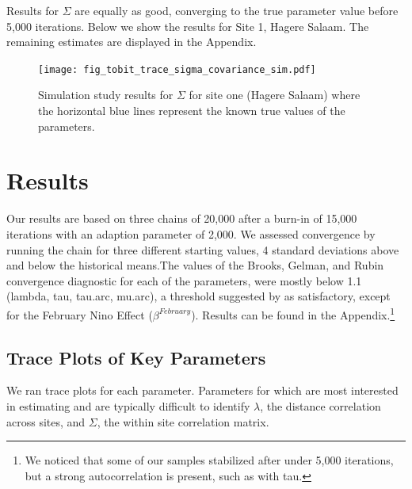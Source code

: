 \documentclass[12pt]{article}
\begin{document}
Results for $\Sigma$ are equally as good, converging to the true parameter value before 5,000 iterations. Below we show the results for Site 1, Hagere Salaam. The remaining estimates are displayed in the Appendix. 

\begin{figure}[htbp]
\begin{center}
\caption{Simulation study results for $\Sigma$ for site one (Hagere Salaam) where the horizontal blue lines represent the known true values of the parameters.}  
\texttt{[image: fig\_tobit\_trace\_sigma\_covariance\_sim.pdf]}   
\end{center}
\end{figure}



\section{Results}
\label{sec:results}
Our results are based on three chains of 20,000 after a burn-in of 15,000 iterations with an adaption parameter of 2,000. We assessed convergence by running the chain for three different starting values, 4 standard deviations above and below the historical means.The values of the Brooks, Gelman, and Rubin convergence diagnostic for each of the parameters, were mostly below 1.1 (lambda, tau, tau.arc, mu.arc), a threshold suggested by \citet{Gamerman1997} as satisfactory, except for the February Nino Effect ($\beta^{February}$). Results can be found in the Appendix.\footnote{We noticed that some of our samples stabilized after under 5,000 iterations, but a strong autocorrelation is present, such as with tau.}  



\subsection{Trace Plots of Key Parameters}



We ran trace plots for each parameter. Parameters for which are most interested in estimating and are typically difficult to identify $\lambda$, the distance correlation across sites, and $\Sigma$, the within site correlation matrix. 
\end{document}
